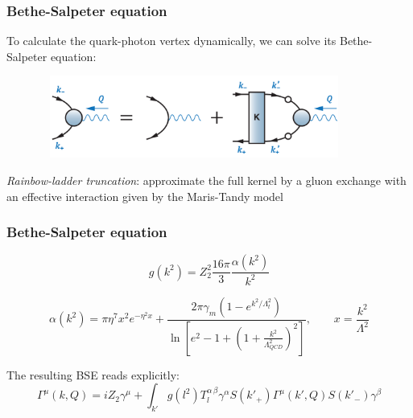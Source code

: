 \begin{frame}
    \frametitle{Bethe-Salpeter equation}
    To calculate the quark-photon vertex dynamically, we can solve its Bethe-Salpeter equation:
    \begin{figure}[h]
        \centering
        \includegraphics[height=2.7cm, width=10.2cm]{graphics/BSE}
        \label{fig:bse}
    \end{figure}
    \textit{Rainbow-ladder truncation}: approximate the full kernel by
    a gluon exchange with an effective interaction given by the Maris-Tandy model


\end{frame}

\begin{frame}
    \frametitle{Bethe-Salpeter equation}

    \begin{equation}\label{eq:4}
        g(k^2)=Z^2_2\frac{16\pi}{3}\frac{\alpha(k^2)}{k^2}
    \end{equation}

    \begin{equation}\label{eq:5}
        \alpha(k^2)=\pi \eta^7 x^2 e^{-\eta^2 x} + \frac{2\pi\gamma_m\left(1-e^{k^2/\Lambda_t^2}\right)}{\ln\left[e^2 - 1 + \left(1 + \frac{k^2}{\Lambda_{QCD}^2}\right)^2\right]}, \qquad x=\frac{k^2}{\Lambda^2}
    \end{equation}

    The resulting BSE reads explicitly:
    \begin{equation}\label{eq:6}
        \Gamma^\mu(k, Q)=iZ_2\gamma^\mu+\int_{k'}\!\!g(l^2)T^{\alpha\,\beta}_l\gamma^\alpha S(k'_+)\Gamma^\mu(k', Q)S(k'_-)\gamma^\beta
    \end{equation}
\end{frame}

\endinput
